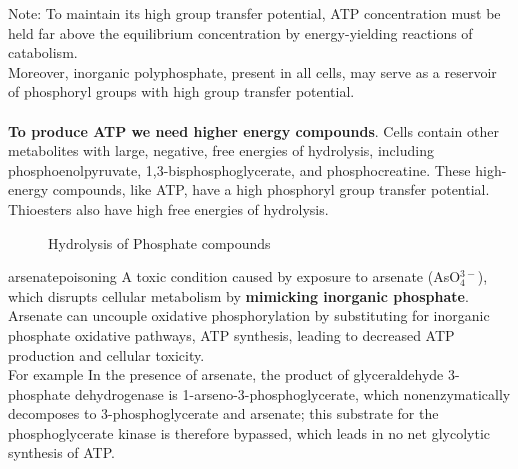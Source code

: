 \documentclass[../main.tex]{subfiles}
\begin{document}
Note: To maintain its high group transfer potential, ATP concentration must be held far above the equilibrium concentration by energy-yielding reactions of catabolism.\\
Moreover, inorganic polyphosphate, present in all cells, may serve as a reservoir of phosphoryl groups with high group transfer potential. \\
\\
\textbf{To produce ATP we need higher energy compounds}. Cells contain other metabolites with large, negative, free energies of hydrolysis, including phosphoenolpyruvate, 1,3-bisphosphoglycerate, and phosphocreatine. These high-energy compounds, like ATP, have a high phosphoryl group transfer potential. Thioesters also have high free energies of hydrolysis.
\begin{figure}[H]
	\centering
	\caption{Hydrolysis of Phosphate compounds}
\end{figure}

\begin{RemarkWithTitel}{\gls{arsenatepoisoning}}
	A toxic condition caused by exposure to arsenate (AsO$_4^{3-}$), which disrupts cellular metabolism by \textbf{mimicking inorganic phosphate}. Arsenate can uncouple oxidative phosphorylation by substituting for inorganic phosphate oxidative pathways, ATP synthesis, leading to decreased ATP production and cellular toxicity.\\
	For example In the presence of arsenate, the product of glyceraldehyde 3-phosphate dehydrogenase is 1-arseno-3-phosphoglycerate, which nonenzymatically decomposes to 3-phosphoglycerate and arsenate; this substrate for the phosphoglycerate kinase is therefore bypassed, which leads in no net glycolytic synthesis of ATP.
\end{RemarkWithTitel}
\end{document}
